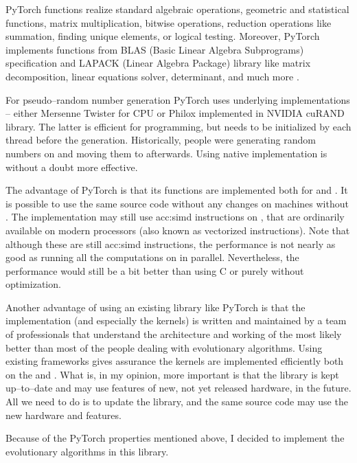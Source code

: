 PyTorch functions realize standard algebraic operations, geometric and statistical functions, matrix multiplication, bitwise operations, reduction operations like summation, finding unique elements, or logical testing. Moreover, PyTorch implements functions from BLAS (Basic Linear Algebra Subprograms) specification and LAPACK (Linear Algebra Package) library like matrix decomposition, linear equations solver, determinant, and much more \citep{PyTorchDoc}.

For pseudo--random number generation PyTorch uses underlying implementations -- either Mersenne Twister for CPU or Philox implemented in NVIDIA cuRAND library. The latter is efficient for \cuda programming, but needs to be initialized by each thread before the generation. Historically, people were generating random numbers on \cpu and moving them to \gpu afterwards. Using native \cuda implementation is without a doubt more effective.

The advantage of PyTorch is that its functions are implemented both for \cpu and \gpuns. It is possible to use the same source code without any changes on machines without \gpuns. The implementation may still use \acrshort{acc:simd} instructions on \cpuns, that are ordinarily available on modern processors (also known as vectorized instructions). Note that although these are still \acrshort{acc:simd} instructions, the performance is not nearly as good as running all the computations on \gpu in parallel. Nevertheless, the performance would still be a bit better than using C or \cpp purely without optimization.

Another advantage of using an existing library like PyTorch is that the implementation (and especially the \cuda kernels) is written and maintained by a team of professionals that understand the architecture and working of the \gpu most likely better than most of the people dealing with evolutionary algorithms. Using existing frameworks gives assurance the kernels are implemented efficiently both on the \gpu and \cpuns. What is, in my opinion, more important is that the library is kept up--to--date and may use features of new, not yet released hardware, in the future. All we need to do is to update the library, and the same source code may use the new hardware and features.

Because of the PyTorch properties mentioned above, I decided to implement the evolutionary algorithms in this library.




